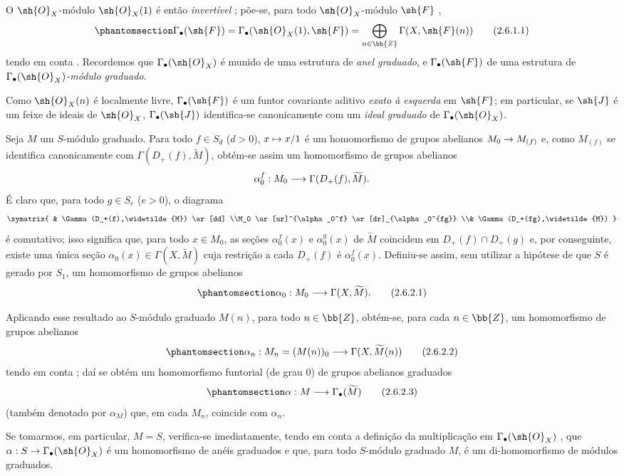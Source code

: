 \documentclass[oneside,10pt]{amsart}
\makeatletter
\newcommand{\ega@arrow}[2]{\mathchoice{#1}{#2}{#2}{#2}}
\let\ega@shortmapsto\mapsto
\renewcommand{\to}{\ega@arrow{\longrightarrow}{\rightarrow}}
\renewcommand{\mapsto}{\ega@arrow{\longmapsto}{\ega@shortmapsto}}
\newcommand{\oldpage}[2][]{\marginnote{\normalfont\footnotesize\textbf{#1}~|~#2}\ignorespaces}
\let\EGAOriginalLabel\label
\renewcommand{\label}[1]{\phantomsection\EGAOriginalLabel{#1}}
\makeatother
\begin{document}
\begin{env}[2.6.1]
\label{II.2.6.1}
O $\sh{O}_X$-módulo $\sh{O}_X(1)$ é então \emph{invertível} ; põe-se, para todo $\sh{O}_X$-módulo $\sh{F}$ ,
\[
\label{II.2.6.1.1}
  \Gamma_\bullet(\sh{F})
  =\Gamma_\bullet(\sh{O}_X(1),\sh{F})
  =\bigoplus_{n\in\bb{Z}}\Gamma(X,\sh{F}(n))
\tag{2.6.1.1}
\]
tendo em conta .
Recordemos  que $\Gamma_\bullet(\sh{O}_X)$ é munido de uma estrutura de \emph{anel graduado}, e $\Gamma_\bullet(\sh{F})$ de uma estrutura de \emph{$\Gamma_\bullet(\sh{O}_X)$-módulo graduado}.

Como $\sh{O}_X(n)$ é localmente livre, $\Gamma_\bullet(\sh{F})$ é um funtor covariante aditivo \emph{exato à esquerda} em $\sh{F}$; em particular, se $\sh{J}$ é um feixe de ideais de $\sh{O}_X$, $\Gamma_\bullet(\sh{J})$ identifica-se canonicamente com um \emph{ideal graduado} de $\Gamma_\bullet(\sh{O}_X)$.
\end{env}

\begin{env}[2.6.2]
\label{II.2.6.2}
Seja $M$ um $S$-módulo graduado.
Para todo $f\in S_d$ ($d>0$), $x\mapsto x/1$ é um homomorfismo de grupos abelianos $M_0\to M_{(f)}$ e, como $M_{(f)}$ se identifica canonicamente
\oldpage[II]{37}
com $\Gamma(D_+(f),\widetilde{M})$, obtém-se assim um homomorfismo de grupos abelianos
\[
  \alpha_0^f:M_0\to\Gamma(D_+(f),\widetilde{M}).
\]
É claro que, para todo $g\in S_e$ ($e>0$), o diagrama
\[
  \xymatrix{
    & \Gamma(D_+(f),\widetilde{M}) \ar[dd]
  \\M_0 \ar[ur]^{\alpha_0^f} \ar[dr]_{\alpha_0^{fg}}
  \\& \Gamma(D_+(fg),\widetilde{M})
  }
\]
é comutativo; isso significa que, para todo $x\in M_0$, as seções $\alpha_0^f(x)$ e $\alpha_0^g(x)$ de $\widetilde{M}$ coincidem em $D_+(f)\cap D_+(g)$ e, por conseguinte, existe uma única seção $\alpha_0(x)\in\Gamma(X,\widetilde{M})$ cuja restrição a cada $D_+(f)$ é $\alpha_0^f(x)$.
Definiu-se assim, sem utilizar a hipótese de que $S$ é gerado por $S_1$, um homomorfismo de grupos abelianos
\[
\label{II.2.6.2.1}
  \alpha_0:M_0\to\Gamma(X,\widetilde{M}).
\tag{2.6.2.1}
\]

Aplicando esse resultado ao $S$-módulo graduado $M(n)$, para todo $n\in\bb{Z}$, obtém-se, para cada $n\in\bb{Z}$, um homomorfismo de grupos abelianos
\[
\label{II.2.6.2.2}
  \alpha_n:M_n=(M(n))_0\to\Gamma(X,\widetilde{M}(n))
\tag{2.6.2.2}
\]
tendo em conta ; daí se obtém um homomorfismo funtorial (de grau $0$) de grupos abelianos graduados
\[
\label{II.2.6.2.3}
  \alpha:M\to\Gamma_\bullet(\widetilde{M})
\tag{2.6.2.3}
\]
(também denotado por $\alpha_M$) que, em cada $M_n$, coincide com $\alpha_n$.

Se tomarmos, em particular, $M=S$, verifica-se imediatamente, tendo em conta a definição da multiplicação em $\Gamma_\bullet(\sh{O}_X)$ , que $\alpha:S\to\Gamma_\bullet(\sh{O}_X)$ é um homomorfismo de anéis graduados e que, para todo $S$-módulo graduado $M$,  é um di-homomorfismo de módulos graduados.
\end{env}
\end{document}
